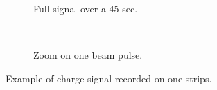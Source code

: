 \begin{figure}[!ht]
  \begin{subfigure}[t]{0.5\textwidth}
    
    \caption{Full signal over a 45 sec.}
    \label{}
  \end{subfigure}
  ~
  \begin{subfigure}[t]{0.5\textwidth}
    
    \caption{Zoom on one beam pulse.}
    \label{}
  \end{subfigure}
  \caption[Example of charge signal recorded on one strips]{Example of charge signal recorded on one strips.}
  \label{chap4:strips_signal}
\end{figure}
